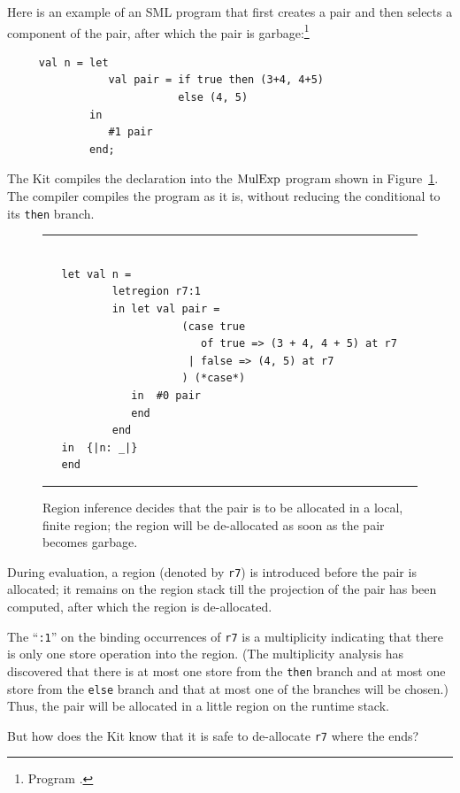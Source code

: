 \documentclass[12pt]{book}
\begin{document}
Here is an example of an SML program that first creates a pair and
then selects a component of the pair, after which the pair is garbage:\footnote{Program .}
\begin{verbatim}
     val n = let 
                val pair = if true then (3+4, 4+5) 
                           else (4, 5)
             in 
                #1 pair
             end;
\end{verbatim}
The Kit compiles the declaration into the 
$\hbox{\rm MulExp}$ program shown in Figure~\ref{elimpair.fig}.
The compiler compiles the program as it is, without reducing the conditional
to its {\tt then} branch.
\begin{figure}
\hrule
\begin{verbatim}

   let val n = 
           letregion r7:1 
           in let val pair = 
                      (case true 
                         of true => (3 + 4, 4 + 5) at r7 
                       | false => (4, 5) at r7
                      ) (*case*) 
              in  #0 pair
              end  
           end
   in  {|n: _|}
   end 
\end{verbatim}
\caption{Region inference decides that the 
pair is to be allocated in a local, finite region; the region will be de-allocated
as soon as the pair becomes garbage.}
\medskip

\hrule
\label{elimpair.fig}
\end{figure}
During evaluation, a region (denoted by {\tt r7}) 
is introduced before the pair is allocated;
it remains on the region stack till the projection of the pair
has been computed, after which the region is de-allocated. 

The ``{\tt :1}'' on the binding occurrences of {\tt r7}
is a multiplicity indicating that there is only one store
operation into the region. (The multiplicity analysis
has discovered that there is at most one store from the {\tt then}
branch and at most one store from the {\tt else} branch and that
at most one of the branches will be chosen.) Thus, the pair will be
allocated in a little region on the runtime stack.

But how does the Kit know that it is safe to de-allocate {\tt r7}
where the  ends?
\end{document}
